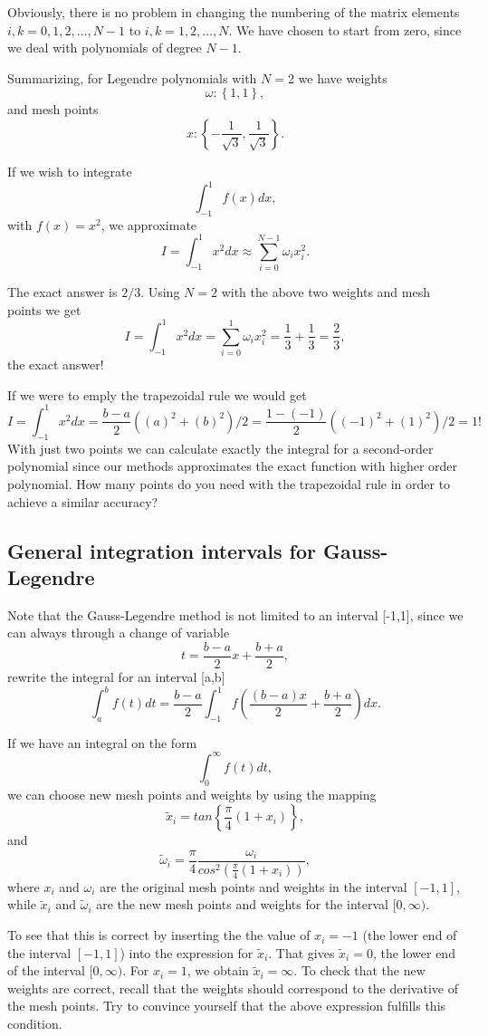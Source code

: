 Obviously, there is no problem in changing the numbering of the matrix elements $i,k=0,1,2,\dots,N-1$ to
$i,k=1,2,\dots,N$.  We have chosen to start from zero, since we deal with polynomials of degree $N-1$.

Summarizing, for Legendre polynomials with $N=2$ we have
weights
\[
   \omega : \left\{1,1\right\},
\]
and mesh points 
\[
   x : \left\{-\frac{1}{\sqrt{3}},\frac{1}{\sqrt{3}}\right\}.
\]


If we wish to integrate 
\[
   \int_{-1}^1f(x)dx,
\]
with $f(x)=x^2$, we approximate
\[ 
   I=\int_{-1}^1x^2dx \approx \sum_{i=0}^{N-1}\omega_ix_i^2.  
\]

The exact answer is $2/3$. Using $N=2$ with the above two weights 
and mesh points we get
\[ 
   I=\int_{-1}^1x^2dx =\sum_{i=0}^{1}\omega_ix_i^2=\frac{1}{3}+\frac{1}{3}=\frac{2}{3},  
\]
the exact answer!

If we were to emply the trapezoidal rule we would get
\[ 
   I=\int_{-1}^1x^2dx =\frac{b-a}{2}\left((a)^2+(b)^2\right)/2=
                       \frac{1-(-1)}{2}\left((-1)^2+(1)^2\right)/2=1!
\]
With just two points we can calculate exactly the integral for a second-order
polynomial since our methods approximates the exact function with higher
order polynomial. 
How many points do you need with the trapezoidal rule in order to achieve a
similar accuracy?

\subsection{General integration intervals for Gauss-Legendre}

Note that the Gauss-Legendre method is not limited
to an interval [-1,1], since we can always through a change of variable
\[
   t=\frac{b-a}{2}x+\frac{b+a}{2},
\]
rewrite  the integral for an interval  [a,b]
\[
  \int_a^bf(t)dt=\frac{b-a}{2}\int_{-1}^1f\left(\frac{(b-a)x}{2}+\frac{b+a}{2}\right)dx.
\]

If we have an integral on the form
\[
  \int_0^{\infty}f(t)dt,
\]
we can choose new mesh points and weights by using the mapping  
\[
\tilde{x}_i=tan\left\{\frac{\pi}{4}(1+x_i)\right\},
\]
and 
\[
\tilde{\omega}_i= \frac{\pi}{4}\frac{\omega_i}{cos^2\left(\frac{\pi}{4}(1+x_i)\right)},
\]
where $x_i$ and $\omega_i$ are the original mesh points and weights in the 
interval $[-1,1]$, while $\tilde{x}_i$ and $\tilde{\omega}_i$ are the new
mesh points and weights for the interval $[0,\infty)$. 

To see  that this is correct by inserting the 
the value of $x_i=-1$ (the lower end of the interval $[-1,1]$)
into the expression for $\tilde{x}_i$. That gives $\tilde{x}_i=0$,
the lower end of the interval $[0,\infty)$. For
$x_i=1$, we obtain $\tilde{x}_i=\infty$. To check that the new
weights are correct, recall that the weights should correspond to the 
derivative of the mesh points. Try to convince yourself that the
above expression fulfills this condition.



